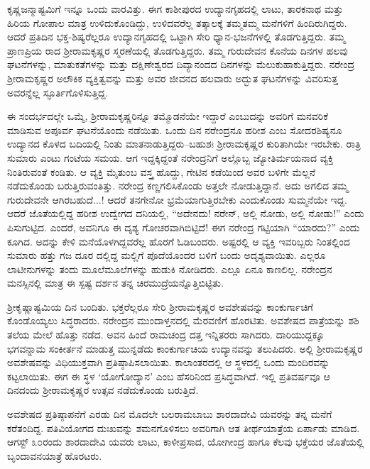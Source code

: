 ಕೃಷ್ಣಜನ್ಮಾಷ್ಟಮಿಗೆ ಇನ್ನೂ ಒಂದು ವಾರವಿತ್ತು. ಈಗ ಕಾಶೀಪುರದ ಉದ್ಯಾನಗೃಹದಲ್ಲಿ ಲಾಟು, ತಾರಕನಾಥ ಮತ್ತು ಹಿರಿಯ ಗೋಪಾಲ ಮಾತ್ರ ಉಳಿದುಕೊಂಡಿದ್ದು, ಉಳಿದವರೆಲ್ಲ ತತ್ಕಾಲಕ್ಕೆ ತಮ್ಮತಮ್ಮ ಮನೆಗಳಿಗೆ ಹಿಂದಿರುಗಿದ್ದರು. ಆದರೆ ಪ್ರತಿದಿನ ಭಕ್ತ-ಶಿಷ್ಯರೆಲ್ಲರೂ ಉದ್ಯಾನಗೃಹದಲ್ಲಿ ಒಟ್ಟಾಗಿ ಸೇರಿ ಧ್ಯಾನ-ಭಜನೆಗಳಲ್ಲಿ ತೊಡಗುತ್ತಿದ್ದರು. ತಮ್ಮ ಪ್ರಾಣಪ್ರಿಯ ರಾದ ಶ್ರೀರಾಮಕೃಷ್ಣರ ಸ್ಮರಣೆಯಲ್ಲಿ ತೊಡಗುತ್ತಿದ್ದರು. ತಮ್ಮ ಗುರುದೇವನ ಕೊನೆಯ ದಿನಗಳ ಹಲವು ಘಟನೆಗಳನ್ನು, ಮಾತುಕತೆಗಳನ್ನು ಮತ್ತು ದಕ್ಷಿಣೇಶ್ವರದ ದಿವ್ಯಾನಂದದ ದಿನಗಳನ್ನು ಮೆಲುಕುಹಾಕುತ್ತಿದ್ದರು. ನರೇಂದ್ರ ಶ್ರೀರಾಮಕೃಷ್ಣರ ಅಲೌಕಿಕ ವ್ಯಕ್ತಿತ್ವವನ್ನು ಮತ್ತು ಅವರ ಜೀವನದ ಹಲವಾರು ಅದ್ಭುತ ಘಟನೆಗಳನ್ನು ವಿವರಿಸುತ್ತ ಅವರನ್ನೆಲ್ಲ ಸ್ಫೂರ್ತಿಗೊಳಿಸುತ್ತಿದ್ದ.

ಈ ಸಂದರ್ಭದಲ್ಲೇ ಒಮ್ಮೆ, ಶ್ರೀರಾಮಕೃಷ್ಣರಿನ್ನೂ ತಮ್ಮೊಡನೆಯೇ ಇದ್ದಾರೆ ಎಂಬುದನ್ನು ಅವರಿಗೆ ಮನವರಿಕೆ ಮಾಡಿಸುವ ಅಪೂರ್ವ ಘಟನೆಯೊಂದು ನಡೆಯಿತು. ಒಂದು ದಿನ ನರೇಂದ್ರನೂ ಹರೀಶ ಎಂಬ ಸೋದರಶಿಷ್ಯನೂ ಉದ್ಯಾನದ ಕೊಳದ ಬದಿಯಲ್ಲಿ ನಿಂತು ಮಾತನಾಡುತ್ತಿದ್ದರು–ಬಹುಶಃ ಶ್ರೀರಾಮಕೃಷ್ಣರ ಕುರಿತಾಗಿಯೇ ಇರಬೇಕು. ರಾತ್ರಿ ಸುಮಾರು ಎಂಟು ಗಂಟೆಯ ಸಮಯ. ಆಗ ಇದ್ದಕ್ಕಿದ್ದಂತೆ ನರೇಂದ್ರನಿಗೆ ಅಲ್ಲೊಬ್ಬ ಜ್ಯೋತಿರ್ಮಯನಾದ ವ್ಯಕ್ತಿ ನಿಂತಿರುವಂತೆ ಕಂಡಿತು. ಆ ವ್ಯಕ್ತಿ ಮೈತುಂಬ ವಸ್ತ್ರ ಹೊದ್ದು, ಗೇಟಿನ ಕಡೆಯಿಂದ ಅವರ ಬಳಿಗೇ ಮೆಲ್ಲನೆ ನಡೆದುಕೊಂಡು ಬರುತ್ತಿರುವಂತಿತ್ತು. ನರೇಂದ್ರ ಕಣ್ಣಗಲಿಸಿಕೊಂಡು ಅತ್ತಲೇ ನೋಡುತ್ತಿದ್ದಾನೆ. ಅದು ಅಗಲಿದ ತಮ್ಮ ಗುರುದೇವನೇ ಆಗಿರಬಹುದೆ...! ಆದರೆ ತನಗೇನೋ ಭ್ರಮೆಯಾಗುತ್ತಿರಬೇಕು ಎಂದುಕೊಂಡು ಸುಮ್ಮನೆಯೇ ಇದ್ದ. ಆದರೆ ಜೊತೆಯಲ್ಲಿದ್ದ ಹರೀಶ ಉದ್ವೇಗದ ದನಿಯಲ್ಲಿ, “ಅದೇನದು! ನರೇನ್, ಅಲ್ಲಿ ನೋಡು, ಅಲ್ಲಿ ನೋಡು!” ಎಂದು ಪಿಸುಗುಟ್ಟಿದ. ಎಂದರೆ, ಅವನಿಗೂ ಈ ದೃಶ್ಯ ಗೋಚರವಾಗಿಬಿಟ್ಟಿದೆ! ಈಗ ನರೇಂದ್ರ ಗಟ್ಟಿಯಾಗಿ “ಯಾರದು?” ಎಂದು ಕೂಗಿದ. ಅದನ್ನು ಕೇಳಿ ಮನೆಯೊಳಗಿದ್ದವರೆಲ್ಲ ಹೊರಗೆ ಓಡಿಬಂದರು. ಅಷ್ಟರಲ್ಲಿ ಆ ವ್ಯಕ್ತಿ ಇವರಿಬ್ಬರು ನಿಂತಲ್ಲಿಂದ ಸುಮಾರು ಹತ್ತು ಗಜ ದೂರ ದಲ್ಲಿದ್ದ ಮಲ್ಲಿಗೆ ಪೊದೆಯೊಂದರ ಬಳಿಗೆ ಬಂದು ಅದೃಶ್ಯವಾಯಿತು. ಎಲ್ಲರೂ ಲಾಟೀನುಗಳನ್ನು ತಂದು ಮೂಲೆಮೂಲೆಗಳನ್ನು ಹುಡುಕಿ ನೋಡಿದರು. ಎಲ್ಲೂ ಏನೂ ಕಾಣಲಿಲ್ಲ. ನರೇಂದ್ರನ ಮನಸ್ಸಿನಲ್ಲಿ ಮಾತ್ರ ಈ ಸ್ಪಷ್ಟ ದರ್ಶನ ತನ್ನ ಚಿರಮುದ್ರೆಯನ್ನೊತ್ತಿಬಿಟ್ಟಿತು.

ಶ್ರೀಕೃಷ್ಣಾಷ್ಟಮಿಯ ದಿನ ಬಂದಿತು. ಭಕ್ತರೆಲ್ಲರೂ ಸೇರಿ ಶ್ರೀರಾಮಕೃಷ್ಣರ ಅವಶೇಷವನ್ನು ಕಾಂಕುರ್ಗಾಚಿಗೆ ಕೊಂಡೊಯ್ಯಲು ಸಿದ್ಧರಾದರು. ನರೇಂದ್ರನ ಮುಂದಾಳ್ತನದಲ್ಲಿ ಮೆರವಣಿಗೆ ಹೊರಟಿತು. ಅವಶೇಷದ ಪಾತ್ರೆಯನ್ನು ಶಶಿ ತಲೆಯ ಮೇಲೆ ಹೊತ್ತು ನಡೆದ. ಅವನ ಹಿಂದೆ ರಾಮಚಂದ್ರ ದತ್ತ ಇನ್ನಿತರರು ಸಾಗಿದರು. ದಾರಿಯುದ್ದಕ್ಕೂ ಭಗವನ್ನಾಮ ಸಂಕೀರ್ತನೆ ಮಾಡುತ್ತ ಮುನ್ನಡೆದು ಕಾಂಕುರ್ಗಾಚಿಯ ಉದ್ಯಾನವನ್ನು ತಲುಪಿದರು. ಅಲ್ಲಿ ಶ್ರೀರಾಮಕೃಷ್ಣರ ಅವಶೇಷವನ್ನು ವಿಧಿಯುಕ್ತವಾಗಿ ಪ್ರತಿಷ್ಠಾಪಿಸಲಾಯಿತು. ಕಾಲಾಂತರದಲ್ಲಿ ಆ ಸ್ಥಳದಲ್ಲಿ ಒಂದು ಮಂದಿರವನ್ನು ಕಟ್ಟಲಾಯಿತು. ಈಗ ಈ ಸ್ಥಳ ‘ಯೋಗೋದ್ಯಾನ’ ಎಂಬ ಹೆಸರಿನಿಂದ ಪ್ರಸಿದ್ಧವಾಗಿದೆ. ಇಲ್ಲಿ ಪ್ರತಿವರ್ಷವೂ ಆ ದಿನದಂದು ಶ್ರೀರಾಮಕೃಷ್ಣರ ಉತ್ಸವ ನಡೆದುಕೊಂಡು ಬರುತ್ತಿದೆ.

ಅವಶೇಷದ ಪ್ರತಿಷ್ಠಾಪನೆಗೆ ಎರಡು ದಿನ ಮೊದಲೇ ಬಲರಾಮಬಾಬು ಶಾರದಾದೇವಿ ಯವರನ್ನು ತನ್ನ ಮನೆಗೆ ಕರೆತಂದಿದ್ದ. ಪತಿವಿಯೋಗದ ದುಃಖವನ್ನು ಶಮನಗೊಳಿಸಲು ಅವರಿಗಾಗಿ ಆತ ತೀರ್ಥಯಾತ್ರೆಯ ಏರ್ಪಾಡು ಮಾಡಿದ. ಆಗಸ್ಟ್ ೩೦ರಂದು ಶಾರದಾದೇವಿ ಯವರು ಲಾಟು, ಕಾಳೀಪ್ರಸಾದ, ಯೋಗೀಂದ್ರ ಹಾಗೂ ಕೆಲವು ಭಕ್ತೆಯರ ಜೊತೆಯಲ್ಲಿ ಬೃಂದಾವನಯಾತ್ರೆ ಹೊರಟರು.

